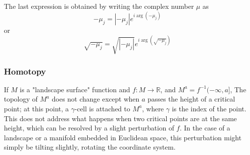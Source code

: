The last expression is obtained by writing the complex number $\mu$ as
$$
-\mu_j = |-\mu_j| e^{i \arg(-\mu_j)}
$$
or
$$
\sqrt{-\mu_j} = \sqrt{|-\mu_j|} e^{i \arg(\sqrt{-\mu_j})}
$$

\subsubsection{Homotopy}

If $M$ is a "landscape surface" function and $f : M \rightarrow \mathbb{R}$,
and $M^a = f^{-1} (-\infty, a]$,
The topology of $M^{a}$ does not change except when $a$ passes the height of a critical point;
at this point, a $\gamma$-cell is attached to $M^{a}$, where $\gamma$ is the index of the point.
This does not address what happens when two critical points are at the same height,
which can be resolved by a slight perturbation of $f$.
In the case of a landscape or a manifold embedded in Euclidean space, this perturbation might simply be tilting slightly, rotating the coordinate system. 
